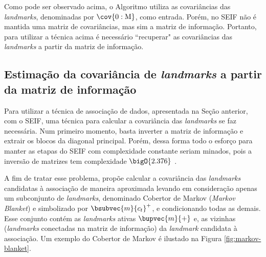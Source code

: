 Como pode ser observado acima, o Algoritmo utiliza as covariâncias das 
\textit{landmarks}, denominadas por $\cov{0:\mathrm{M}}$, como 
entrada. Porém, no SEIF não é mantida uma matriz de covariâncias, mas sim a matriz de informação. Portanto, para utilizar a técnica acima é 
necessário ``recuperar" as covariâncias das \textit{landmarks} a partir 
da matriz de informação.

\subsection{Estimação da covariância de \textit{landmarks} a partir da 
matriz de informação}
Para utilizar a técnica de associação de dados, apresentada na Seção 
anterior, com o SEIF, uma técnica para calcular a covariância das \textit{landmarks} se faz necessária. Num primeiro momento, basta inverter a 
matriz de informação e extrair os blocos da diagonal principal. Porém, 
dessa forma todo o esforço para manter as etapas do SEIF com 
complexidade constante seriam minados, pois a inversão de matrizes tem 
complexidade $\bigO{2.376}$ \cite{coppersmith1987matrix}.

A fim de tratar esse problema, \cite[p.~5]{liu2003results} propõe 
calcular a covariância das \textit{landmarks} candidatas à associação 
de maneira aproximada levando em consideração apenas um subconjunto 
de \textit{landmarks}, denominado Cobertor de Markov 
(\textit{Markov Blanket}) e simbolizado por $\bsubvec{m}{c_t}^+$, e condicionando todas as demais. Esse conjunto contém as \textit{landmarks} ativas 
$\bupvec{m}{+}$ e, as vizinhas (\textit{landmarks} conectadas na matriz de 
informação) da \textit{landmark} candidata à associação. Um exemplo do Cobertor 
de Markov é ilustado na Figura \ref{fig:markov-blanket}.

